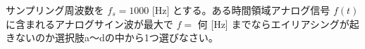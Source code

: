 サンプリング周波数を $f_s = 1000$ [Hz] とする。ある時間領域アナログ信号 $f(t)$ に含まれるアナログサイン波が最大で $f=$ 何 [Hz] までならエイリアシングが起きないのか選択肢a〜dの中から1つ選びなさい。
